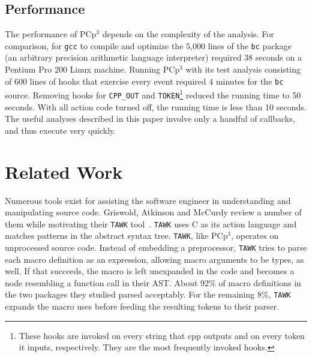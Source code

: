 \documentclass{article}
\newcommand{\pcp}{\mbox{\textsf{PCp}$^3$}}
\newcommand{\Cpp}{\mbox{\textsf{cpp}}}
\newcommand{\C}{\mbox{C}}
\begin{document}
\subsection{Performance}
\label{sec:pcp3_performance}
The performance of \pcp{} depends on the complexity of the
analysis.  For comparison, for \texttt{gcc} to compile and optimize the
5,000 lines of the \texttt{bc} package~\cite{bc} (an arbitrary precision
arithmetic language interpreter) required 38 seconds on a Pentium Pro
200 Linux machine.  Running \pcp{} with its test analysis consisting of
600 lines of hooks that exercise every event required 4 minutes for the
\texttt{bc} source.  Removing hooks for \texttt{CPP\_OUT} and
\texttt{TOKEN}\footnote{These hooks are invoked on every string that
  \Cpp{} outputs and on every token it inputs, respectively.  They are
  the most frequently invoked hooks.} reduced the running time to 50
seconds.  With all action code turned off, the running time is 
less than 10 seconds.  The useful analyses described in this paper involve
only a handful of callbacks, and thus execute very quickly.

\section{Related Work}
\label{sec:related}
Numerous tools exist for assisting the software engineer in
understanding and manipulating source code.  Griswold, Atkinson and McCurdy
review a number of them while motivating their \texttt{TAWK}
tool~\cite{Griswold96}.  \texttt{TAWK} uses \C{} as its action language
and matches patterns in the abstract syntax tree.  \texttt{TAWK}, like
\pcp{}, operates on unprocessed source code.  Instead of embedding a
preprocessor, \texttt{TAWK} tries to parse each macro definition as an
expression, allowing macro arguments to be types, as well.  If that
succeeds, the macro is left unexpanded in the code and becomes a node
resembling a function call in their AST.  About 92\% of macro
definitions in the two packages they studied parsed acceptably.  For the
remaining 8\%, \texttt{TAWK} expands the macro uses before feeding the resulting tokens to
their parser.
\end{document}
